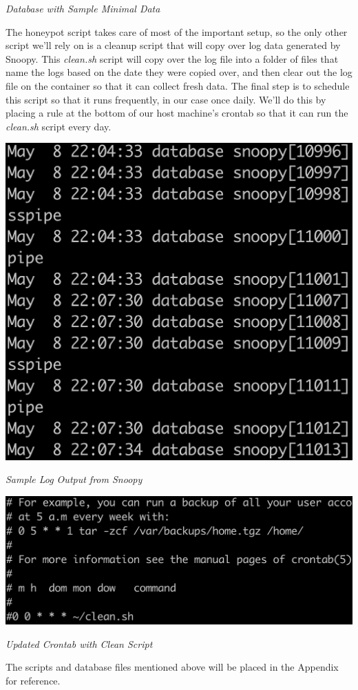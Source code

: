 \documentclass[12pt]{article}
\begin{document}
\begin{center} \textit{Database with Sample Minimal Data} \end{center}
\qquad The honeypot script takes care of most of the important setup, so the only other script we’ll rely on is a cleanup script that will copy over log data generated by Snoopy. This \textit{clean.sh} script will copy over the log file into a folder of files that name the logs based on the date they were copied over, and then clear out the log file on the container so that it can collect fresh data. The final step is to schedule this script so that it runs frequently, in our case once daily. We’ll do this by placing a rule at the bottom of our host machine’s crontab so that it can run the \textit{clean.sh} script every day. \newline
\begin{center} \includegraphics[scale=0.5]{./snoopy.png} \end{center}
\begin{center} \textit{Sample Log Output from Snoopy} \end{center}
\begin{center} \includegraphics[scale=0.5]{./crontab.png} \end{center}
\begin{center} \textit{Updated Crontab with Clean Script} \end{center}
\qquad The scripts and database files mentioned above will be placed in the Appendix for reference. 
\end{document}
